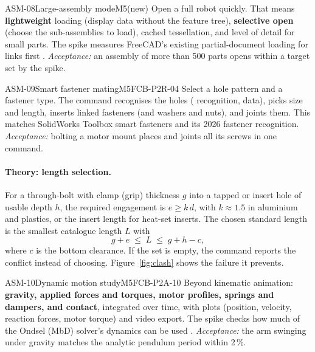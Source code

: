 \begin{epic}{ASM-08}{Large-assembly mode}{M5}{\stTodo}{(new)}
Open a full robot quickly. That means \textbf{lightweight} loading (display data without the feature tree),
\textbf{selective open} (choose the sub-assemblies to load), cached tessellation, and level of detail
for small parts. The spike measures FreeCAD's existing partial-document loading for links first \verify.
\emph{Acceptance:} an assembly of more than 500 parts opens within a target set by the spike.
\end{epic}

\begin{epic}{ASM-09}{Smart fastener mating}{M5}{\stTodo}{FCB-P2R-04}
Select a hole pattern and a fastener type. The command recognises the holes ( recognition,
 data), picks size and length, inserts linked fasteners (and washers and nuts), and joints them.
This matches SolidWorks Toolbox smart fasteners and its 2026 fastener recognition.
\emph{Acceptance:} bolting a motor mount places and joints all its screws in one command.
\end{epic}

\paragraph{Theory: length selection.} For a through-bolt with clamp (grip) thickness $g$ into a tapped or
insert hole of usable depth $h$, the required engagement is $e\ge k\,d$, with $k\approx1.5$ in aluminium
and plastics, or the insert length for heat-set inserts. The chosen standard length is the smallest catalogue
length $L$ with
\[
  g + e \;\le\; L \;\le\; g + h - c ,
\]
where $c$ is the bottom clearance. If the set is empty, the command reports the conflict instead of
choosing. Figure~\ref{fig:clash} shows the failure it prevents.

\begin{epic}{ASM-10}{Dynamic motion study}{M5}{\stTodo}{FCB-P2A-10}
Beyond kinematic animation: \textbf{gravity, applied forces and torques, motor profiles, springs and
dampers, and contact}, integrated over time, with plots (position, velocity, reaction forces, motor
torque) and video export. The spike checks how much of the Ondsel (MbD) solver's dynamics can be used
\verify.
\emph{Acceptance:} the arm swinging under gravity matches the analytic pendulum period within 2\,\%.
\end{epic}

